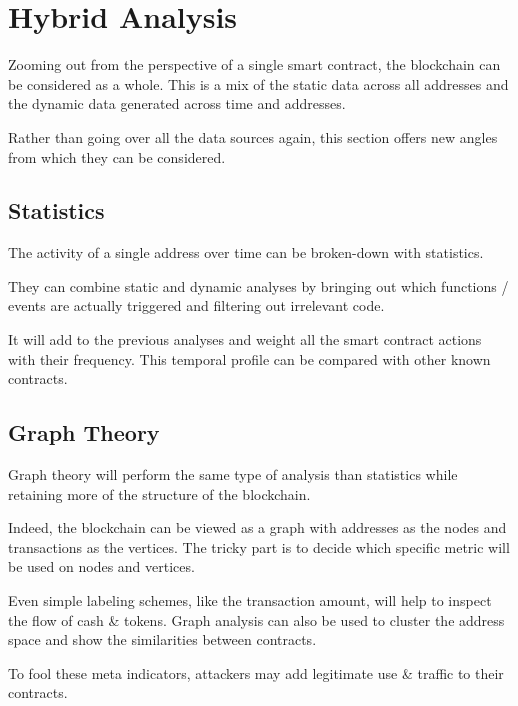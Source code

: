 \section{Hybrid Analysis} \label{sec:data-hybrid}

Zooming out from the perspective of a single smart contract, the blockchain can be considered as a whole.
This is a mix of the static data across all addresses and the dynamic data generated across time and addresses.

Rather than going over all the data sources again, this section offers new angles from which they can be considered.

\subsection{Statistics}

The activity of a single address over time can be broken-down with statistics.

They can combine static and dynamic analyses by bringing out which functions / events are actually triggered and filtering out irrelevant code.

It will add to the previous analyses and weight all the smart contract actions with their frequency.
This temporal profile can be compared with other known contracts.


\subsection{Graph Theory} \label{sec:hybrid-graph}

Graph theory will perform the same type of analysis than statistics while retaining more of the structure of the blockchain.

Indeed, the blockchain can be viewed as a graph with addresses as the nodes and transactions as the vertices.
The tricky part is to decide which specific metric will be used on nodes and vertices.

Even simple labeling schemes, like the transaction amount, will help to inspect the flow  of cash \& tokens.
Graph analysis can also be used to cluster the address space and show the similarities between contracts.

To fool these meta indicators, attackers may add legitimate use \& traffic to their contracts. 

